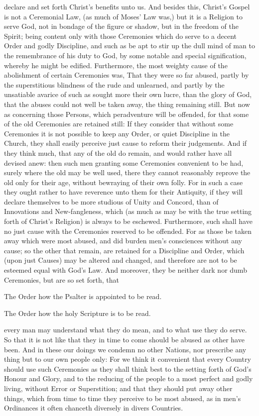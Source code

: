 declare and set forth Christ’s benefits unto us. And besides this, Christ’s Gospel is not a Ceremonial Law, (as much of Moses' Law was,) but it is a Religion to serve God, not in bondage of the figure or shadow, but in the freedom of the Spirit; being content only with those Ceremonies which do serve to a decent Order and godly Discipline, and such as be apt to stir up the dull mind of man to the remembrance of his duty to God, by some notable and special signification, whereby he might be edified. Furthermore, the most weighty cause of the abolishment of certain Ceremonies was, That they were so far abused, partly by the superstitious blindness of the rude and unlearned, and partly by the unsatiable avarice of such as sought more their own lucre, than the glory of God, that the abuses could not well be taken away, the thing remaining still. But now as concerning those Persons, which peradventure will be offended, for that some of the old Ceremonies are retained still: If they consider that without some Ceremonies it is not possible to keep any Order, or quiet Discipline in the Church, they shall easily perceive just cause to reform their judgements. And if they think much, that any of the old do remain, and would rather have all devised anew: then such men granting some Ceremonies convenient to be had, surely where the old may be well used, there they cannot reasonably reprove the old only for their age, without bewraying of their own folly. For in such a case they ought rather to have reverence unto them for their Antiquity, if they will declare themselves to be more studious of Unity and Concord, than of Innovations and New-fangleness, which (as much as may be with the true setting forth of Christ’s Religion) is always to be eschewed. Furthermore, such shall have no just cause with the Ceremonies reserved to be offended. For as those be taken away which were most abused, and did burden men's consciences without any cause; so the other that remain, are retained for a Discipline and Order, which (upon just Causes) may be altered and changed, and therefore are not to be esteemed equal with God’s Law. And moreover, they be neither dark nor dumb Ceremonies, but are so set forth, that

The Order how the Psalter is appointed to be read.

The Order how the holy Scripture is to be read.

every man may understand what they do mean, and to what use they do serve. So that it is not like that they in time to come should be abused as other have been. And in these our doings we condemn no other Nations, nor prescribe any thing but to our own people only: For we think it convenient that every Country should use such Ceremonies as they shall think best to the setting forth of God’s Honour and Glory, and to the reducing of the people to a most perfect and godly living, without Error or Superstition; and that they should put away other things, which from time to time they perceive to be most abused, as in men’s Ordinances it often chanceth diversely in divers Countries.

